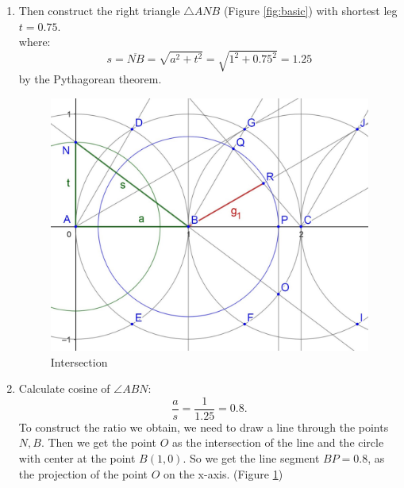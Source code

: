 \documentclass[12pt, letterpaper, oneside]{report}
\begin{document}
\begin{enumerate}
	\item Then construct the right triangle $\triangle ANB$ (Figure \ref{fig:basic}) with shortest leg $t=0.75$. \\
	where:
\begin{equation}
s=\overline{NB}=\sqrt{a^{2}+t^{2}}=\sqrt{1^{2}+0.75^{2}}=1.25
\end{equation}
by the Pythagorean theorem. 
\begin{figure}[h]
	\centerline{\includegraphics[scale=0.2]{images/intersection.jpg}}
	\caption{Intersection}
	\label{intersection}
\end{figure}
 
	\item Calculate cosine of $\angle ABN$:
\begin{equation}
	\dfrac{a}{s}=\dfrac{1}{1.25}=0.8.
\end{equation}
\newpage
To construct the ratio we obtain, we need to draw a line through the points $N, B$. Then we get the point $O$ as the intersection of the line and the circle with center at the point $B(1,0)$. So we get the line segment $BP=0.8$, as the projection of the point $O$ on the x-axis. (Figure \ref{intersection})\\ 
	

\end{enumerate}
\end{document}
